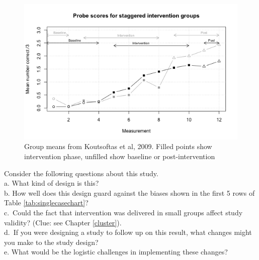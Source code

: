 \documentclass{krantz}
\begin{document}
\begin{figure}
\includegraphics[width=0.85\linewidth]{images_bw/kdataplot} \caption{Group means from Koutsoftas et al, 2009. Filled points show intervention phase, unfilled show baseline or post-intervention}\label{fig:kdataplot}
\end{figure}

Consider the following questions about this study.\\
a. What kind of design is this?\\
b. How well does this design guard against the biases shown in the first 5 rows of Table \ref{tab:singlecasechart}?\\
c.~Could the fact that intervention was delivered in small groups affect study validity? (Clue: see Chapter \ref{cluster}).\\
d.~If you were designing a study to follow up on this result, what changes might you make to the study design?\\
e. What would be the logistic challenges in implementing these changes?
\end{document}
